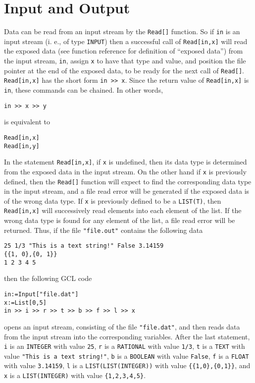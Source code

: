 \section{Input and Output}

Data can be read from an input stream by the \verb+Read[]+ function.
So if \verb+in+ is an input stream (i. e., of type \verb+INPUT+) then
a successful call of \verb+Read[in,x]+ will read the exposed data (see
function reference for definition of ``exposed data'') from the input
stream, \verb+in+, assign \verb+x+ to have that type and value, and
position the file pointer at the end of the exposed data, to be ready
for the next call of \verb+Read[]+.  \verb+Read[in,x]+ has the short
form \verb+in >> x+.  Since the return value of \verb+Read[in,x]+ is
\verb+in+, these commands can be chained.  In other words,

\begin{verbatim}
in >> x >> y
\end{verbatim}
 
\noindent
is equivalent to 

\begin{verbatim}
Read[in,x]
Read[in,y]
\end{verbatim}

\noindent
In the statement \verb+Read[in,x]+, if \verb+x+ is undefined, then its
data type is determined from the exposed data in the input stream.  On
the other hand if \verb+x+ is previously defined, then the
\verb+Read[]+ function will expect to find the corresponding data type
in the input stream, and a file read error will be generated if the
exposed data is of the wrong data type.  If \verb+x+ is previously
defined to be a \verb+LIST(T)+, then \verb+Read[in,x]+ will
successively read elements into each element of the list.  If the
wrong data type is found for any element of the list, a file read
error will be returned.  Thus, if the file \verb+"file.out"+ contains
the following data

\begin{verbatim}
25 1/3 "This is a text string!" False 3.14159 
{{1, 0},{0, 1}}
1 2 3 4 5
\end{verbatim}

\noindent
then the following GCL code

\begin{verbatim}
in:=Input["file.dat"]
x:=List[0,5]
in >> i >> r >> t >> b >> f >> l >> x
\end{verbatim}

\noindent
opens an input stream, consisting of the file \verb+"file.dat"+, and
then reads data from the input stream into the corresponding
variables.  After the last statement, 
\verb+i+ is an \verb+INTEGER+ with value \verb+25+, 
\verb+r+ is a \verb+RATIONAL+ with value \verb+1/3+, 
\verb+t+ is a \verb+TEXT+ with value \verb+"This is a text string!"+, 
\verb+b+ is a \verb+BOOLEAN+ with value \verb+False+, 
\verb+f+ is a \verb+FLOAT+ with value \verb+3.14159+, 
\verb+l+ is a \verb+LIST(LIST(INTEGER))+ with value \verb+{{1,0},{0,1}}+, and 
\verb+x+ is a \verb+LIST(INTEGER)+ with value \verb+{1,2,3,4,5}+.  

